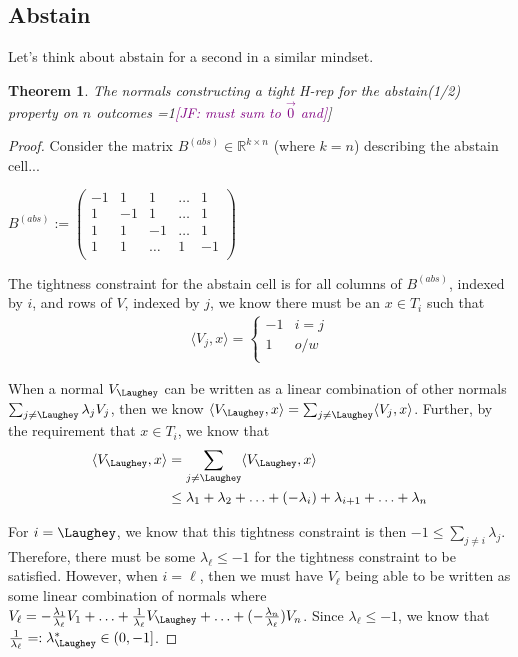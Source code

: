 \documentclass[12pt]{article}
\newcommand{\Comments}{1}
\newcommand{\mynote}[2]{\ifnum\Comments=1\textcolor{#1}{#2}\fi}
\newcommand{\jessie}[1]{\mynote{purple}{[JF: #1]}}
\newcommand{\reals}{\mathbb{R}}
\newcommand{\inprod}[2]{\langle #1, #2 \rangle}
\newtheorem{theorem}{Theorem}
\begin{document}
\subsection{Abstain}
Let's think about abstain for a second in a similar mindset.
\begin{theorem}
	The normals constructing a tight H-rep for the abstain(1/2) property on $n$ outcomes \jessie{must sum to $\vec{0}$ and} [[COOL CHARACTERIZATION]]
\end{theorem}
\begin{proof}
  Consider the matrix $B^{(abs)} \in \reals^{k \times n}$ (where $k = n$) describing the abstain cell...
	
  $B^{(abs)} := \begin{pmatrix}
  -1 & 1 & 1 & \ldots & 1\\
  1 & -1 & 1 & \ldots & 1\\
  1 & 1 & -1 & \ldots & 1\\
  1 & 1 & \ldots & 1 & -1\\
  \end{pmatrix}$
	
  The tightness constraint for the abstain cell is for all columns of $B^{(abs)}$, indexed by $i$, and rows of $V$, indexed by $j$, we know there must be an $x \in T_i$ such that 
  \begin{align*}
  \inprod{V_j}{x} = 
  \begin{cases}
  -1 & i = j\\
  1& o/w\\
  \end{cases}
  \end{align*}
	  
  When a normal $V_{\Laughey}$ can be written as a linear combination of other normals $\sum_{j \neq \Laughey} \lambda_j V_j$, then we know $\inprod{V_{\Laughey}}{x} = \sum_{j \neq \Laughey} \inprod{V_j}{x}$.
  Further, by the requirement that $x \in T_i$, we know that
  \begin{align*}
  	\inprod{V_{\Laughey}}{x} &= \sum_{j \neq \Laughey} \inprod{V_{\Laughey}}{x}\\
  	&\leq \lambda_1 + \lambda_2 + \ldots + (-\lambda_i) + \lambda_{i+1} + \ldots + \lambda_n\\
  \end{align*}
	  
  For $i = \Laughey$, we know that this tightness constraint is then $-1 \leq \sum_{j \neq i} \lambda_j$.
  Therefore, there must be some $\lambda_\ell \leq -1$ for the tightness constraint to be satisfied.
  However, when $i = \ell$, then we must have $V_\ell$ being able to be written as some linear combination of normals where $V_\ell = -\frac{\lambda_1}{\lambda_\ell} V_1 + \ldots + \frac{1}{\lambda_\ell} V_{\Laughey} + \ldots + (- \frac{\lambda_n}{\lambda_\ell}) V_n$.
  Since $\lambda_\ell \leq -1$, we know that $\frac{1}{\lambda_\ell} =: \lambda^*_{\Laughey} \in (0, -1]$.
  \end{proof}
  
\end{document}
